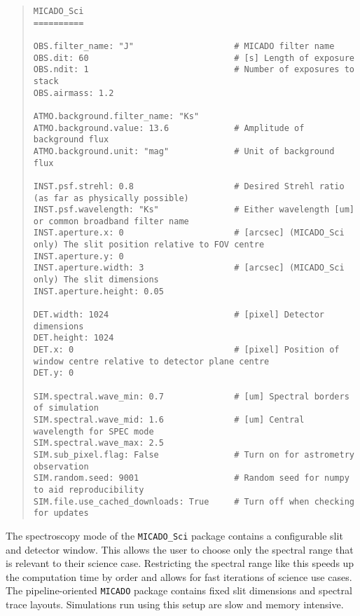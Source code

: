 \begin{quote}
\begin{alltt}
\begin{lstlisting}[frame=single]
MICADO_Sci
==========

OBS.filter_name: "J"                    # MICADO filter name
OBS.dit: 60                             # [s] Length of exposure
OBS.ndit: 1                             # Number of exposures to stack
OBS.airmass: 1.2

ATMO.background.filter_name: "Ks"
ATMO.background.value: 13.6             # Amplitude of background flux
ATMO.background.unit: "mag"             # Unit of background flux

INST.psf.strehl: 0.8                    # Desired Strehl ratio (as far as physically possible)
INST.psf.wavelength: "Ks"               # Either wavelength [um] or common broadband filter name
INST.aperture.x: 0                      # [arcsec] (MICADO_Sci only) The slit position relative to FOV centre
INST.aperture.y: 0
INST.aperture.width: 3                  # [arcsec] (MICADO_Sci only) The slit dimensions
INST.aperture.height: 0.05

DET.width: 1024                         # [pixel] Detector dimensions
DET.height: 1024
DET.x: 0                                # [pixel] Position of window centre relative to detector plane centre
DET.y: 0

SIM.spectral.wave_min: 0.7              # [um] Spectral borders of simulation
SIM.spectral.wave_mid: 1.6              # [um] Central wavelength for SPEC mode
SIM.spectral.wave_max: 2.5
SIM.sub_pixel.flag: False               # Turn on for astrometry observation
SIM.random.seed: 9001                   # Random seed for numpy to aid reproducibility
SIM.file.use_cached_downloads: True     # Turn off when checking for updates
\end{lstlisting}
\end{alltt}
\end{quote}

The spectroscopy mode of the \texttt{MICADO\_Sci} package contains a configurable slit and detector window.
This allows the user to choose only the spectral range that is relevant to their science case.
Restricting the spectral range like this speeds up the computation time by order and allows for fast iterations of science use cases.
The pipeline-oriented \texttt{MICADO} package contains fixed slit dimensions and spectral trace layouts.
Simulations run using this setup are slow and memory intensive.


